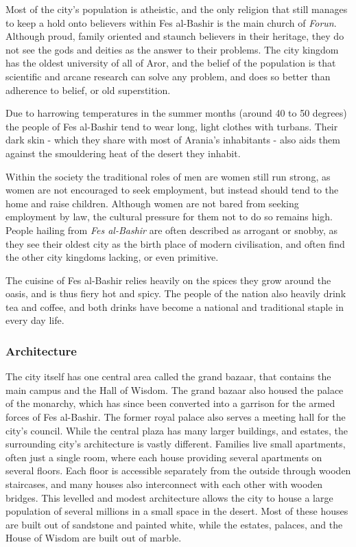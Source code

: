 Most of the city's population is atheistic, and the only religion that still
manages to keep a hold onto believers within Fes al-Bashir is the main church
of \emph{Forun}. Although proud, family oriented and staunch believers in
their heritage, they do not see the gods and deities as the answer to their
problems. The city kingdom has the oldest university of all of Aror, and the
belief of the population is that scientific and arcane research can solve any
problem, and does so better than adherence to belief, or old superstition.

Due to harrowing temperatures in the summer months (around 40 to 50 degrees)
the people of Fes al-Bashir tend to wear long, light clothes with
turbans. Their dark skin - which they share with most of Arania's inhabitants
- also aids them against the smouldering heat of the desert they inhabit.

Within the society the traditional roles of men are women still run strong, as
women are not encouraged to seek employment, but instead should tend to the
home and raise children. Although women are not bared from seeking employment
by law, the cultural pressure for them not to do so remains high. People
hailing from \emph{Fes al-Bashir} are often described as arrogant or snobby,
as they see their oldest city as the birth place of modern civilisation, and
often find the other city kingdoms lacking, or even primitive.

The cuisine of Fes al-Bashir relies heavily on the spices they grow around the
oasis, and is thus fiery hot and spicy. The people of the nation also heavily
drink tea and coffee, and both drinks have become a national and traditional
staple in every day life.

\subsubsection{Architecture}

The city itself has one central area called the grand bazaar, that contains the
main campus and the Hall of Wisdom. The grand bazaar also housed the palace of
the monarchy, which has since been converted into a garrison for the armed
forces of Fes al-Bashir. The former royal palace also serves a meeting hall
for the city's council. While the central plaza has many larger buildings, and
estates, the surrounding city's architecture is vastly different. Families live
small apartments, often just a single room, where each house providing several
apartments on several floors. Each floor is accessible separately from the
outside through wooden staircases, and many houses also interconnect with each
other with wooden bridges. This levelled and modest architecture allows the
city to house a large population of several millions in a small space in the
desert. Most of these houses are built out of sandstone and painted white, while
the estates, palaces, and the House of Wisdom are built out of marble.

